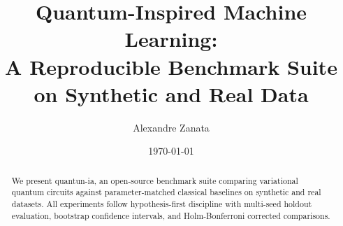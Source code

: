 \documentclass[11pt,a4paper]{article}
\title{Quantum-Inspired Machine Learning:\\
A Reproducible Benchmark Suite on Synthetic and Real Data}
\author{Alexandre Zanata}
\date{\today}
\begin{document}
\maketitle

\begin{abstract}
We present quantun-ia, an open-source benchmark suite comparing variational quantum
circuits against parameter-matched classical baselines on synthetic and real datasets.
All experiments follow hypothesis-first discipline with multi-seed holdout evaluation,
bootstrap confidence intervals, and Holm-Bonferroni corrected comparisons.
\end{abstract}









\end{document}
